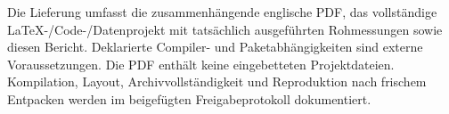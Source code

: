 \documentclass[11pt,a4paper]{article}
\begin{document}
Die Lieferung umfasst die zusammenhängende englische PDF, das vollständige LaTeX-/Code-/Datenprojekt mit tatsächlich ausgeführten Rohmessungen sowie diesen Bericht. Deklarierte Compiler- und Paketabhängigkeiten sind externe Voraussetzungen. Die PDF enthält keine eingebetteten Projektdateien. Kompilation, Layout, Archivvollständigkeit und Reproduktion nach frischem Entpacken werden im beigefügten Freigabeprotokoll dokumentiert.
\end{document}
